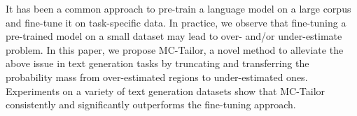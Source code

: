 It has been a common approach to pre-train a language model on a large corpus and fine-tune it on task-specific data. In practice, we observe that fine-tuning a pre-trained model on a small dataset may lead to over- and/or under-estimate problem. In this paper, we propose MC-Tailor, a novel method to alleviate the above issue in text generation tasks by truncating and transferring the probability mass from over-estimated regions to under-estimated ones. Experiments on a variety of text generation datasets show that MC-Tailor consistently and significantly outperforms the fine-tuning approach.
